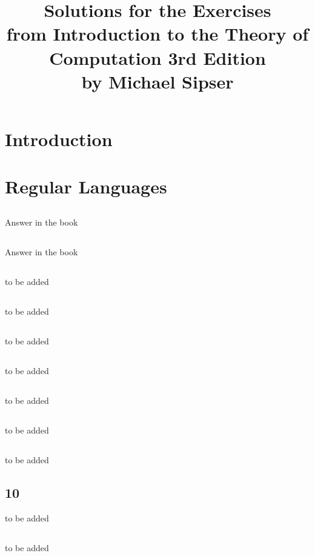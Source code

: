 \documentclass[12pt]{book}
\title{Solutions for the Exercises\\from Introduction to the Theory of Computation 3rd Edition \\by Michael Sipser}
\begin{document}
\setcounter{chapter}{-1}

\maketitle
\chapter{Introduction}

\chapter{Regular Languages}
\section{}
Answer in the book
\section{}
Answer in the book
\section{}
to be added
\section{}
to be added
\section{}
to be added
\section{}
to be added
\section{}
to be added
\section{}
to be added
\section{}
to be added
\section{10}
to be added
\section{}
to be added
\end{document}
